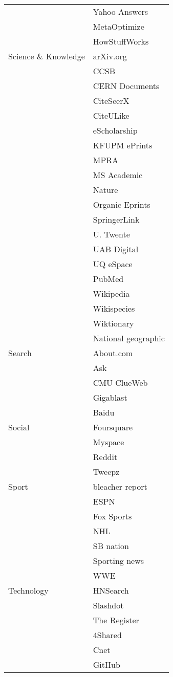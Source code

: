 \begin{center}
\begin{table}
\begin{tabular}{ | l | l | }
& 	Yahoo Answers	\\
& 	MetaOptimize	\\
& 	HowStuffWorks	\\
\hline
Science \& Knowledge
& 	arXiv.org	\\
& 	CCSB	\\
& 	CERN Documents	\\
& 	CiteSeerX	\\
& 	CiteULike	\\
& 	eScholarship	\\
& 	KFUPM ePrints	\\
& 	MPRA	\\
& 	MS Academic	\\
& 	Nature	\\
& 	Organic Eprints	\\
& 	SpringerLink	\\
& 	U. Twente	\\
& 	UAB Digital	\\
& 	UQ eSpace	\\
& 	PubMed	\\
& 	Wikipedia	\\
& 	Wikispecies	\\
& 	Wiktionary	\\
& 	National geographic	\\
\hline
Search
& 	About.com	\\
& 	Ask	\\
& 	CMU ClueWeb	\\
& 	Gigablast	\\
& 	Baidu	\\
\hline
Social
& 	Foursquare	\\
& 	Myspace	\\
& 	Reddit	\\
& 	Tweepz	\\
\hline
Sport
& 	bleacher report	\\
& 	ESPN	\\
& 	Fox Sports	\\
& 	NHL	\\
& 	SB nation	\\
& 	Sporting news	\\
& 	WWE	\\
\hline
Technology
& 	HNSearch	\\
& 	Slashdot	\\
& 	The Register	\\
& 	4Shared	\\
& 	Cnet	\\
& 	GitHub	\\

\end{tabular}
\end{table}
\end{center}
